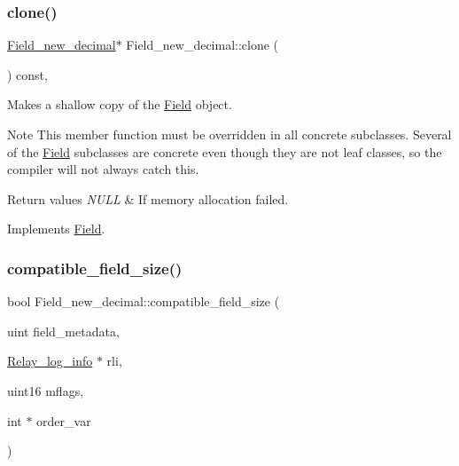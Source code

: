 \subsubsection{\texorpdfstring{clone()}{clone()}\hspace{0.1cm}{\footnotesize\ttfamily [2/2]}}
{\footnotesize\ttfamily \mbox{\hyperlink{classField__new__decimal}{Field\+\_\+new\+\_\+decimal}}$\ast$ Field\+\_\+new\+\_\+decimal\+::clone (\begin{DoxyParamCaption}{ }\end{DoxyParamCaption}) const\hspace{0.3cm}{\ttfamily [inline]}, {\ttfamily [virtual]}}

Makes a shallow copy of the \mbox{\hyperlink{classField}{Field}} object.

\begin{DoxyNote}{Note}
This member function must be overridden in all concrete subclasses. Several of the \mbox{\hyperlink{classField}{Field}} subclasses are concrete even though they are not leaf classes, so the compiler will not always catch this.
\end{DoxyNote}

\begin{DoxyRetVals}{Return values}
{\em N\+U\+LL} & If memory allocation failed. \\
\hline
\end{DoxyRetVals}


Implements \mbox{\hyperlink{classField_a01a9a9aa3a618941e839b1b8793c969d}{Field}}.

\mbox{\label{classField__new__decimal_a55356fb799e02d0d09605cf5c1bbbc11}} 
\subsubsection{\texorpdfstring{compatible\+\_\+field\+\_\+size()}{compatible\_field\_size()}}
{\footnotesize\ttfamily bool Field\+\_\+new\+\_\+decimal\+::compatible\+\_\+field\+\_\+size (\begin{DoxyParamCaption}\item[{uint}]{field\+\_\+metadata,  }\item[{\mbox{\hyperlink{classRelay__log__info}{Relay\+\_\+log\+\_\+info}} $\ast$}]{rli,  }\item[{uint16}]{mflags,  }\item[{int $\ast$}]{order\+\_\+var }\end{DoxyParamCaption})\hspace{0.3cm}{\ttfamily [virtual]}}

